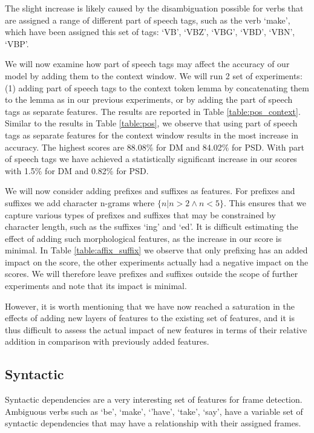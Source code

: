 The slight increase is likely caused by the disambiguation possible for verbs that are assigned a range of different part of speech tags, such as the verb `make', which have been assigned this set of tags: `VB', `VBZ', `VBG', `VBD', `VBN', `VBP'. 

We will now examine how part of speech tags may affect the accuracy of our model by adding them to the context window. We will run 2 set of experiments: (1) adding part of speech tags to the context token lemma by concatenating them to the lemma as in our previous experiments, or by adding the part of speech tags as separate features. The results are reported in Table \ref{table:pos_context}. Similar to the results in Table \ref{table:pos}, we observe that using part of speech tags as separate features for the context window results in the most increase in accuracy. The highest scores are 88.08\% for DM and 84.02\% for PSD. With part of speech tags we have achieved a statistically significant increase in our scores with 1.5\% for DM and 0.82\% for PSD.

We will now consider adding prefixes and suffixes as features. For prefixes and suffixes we add character n-grams where ${\{n|n>2 \wedge n<5\}}$. This ensures that we capture various types of prefixes and suffixes that may be constrained by character length, such as the suffixes `ing' and `ed'. It is difficult estimating the effect of adding such morphological features, as the increase in our score is minimal. In Table \ref{table:affix_suffix} we observe that only prefixing has an added impact on the score, the other experiments actually had a negative impact on the scores. We will therefore leave prefixes and suffixes outside the scope of further experiments and note that its impact is minimal.

However, it is worth mentioning that we have now reached a saturation in the effects of adding new layers of features to the existing set of features, and it is thus difficult to assess the actual impact of new features in terms of their relative addition in comparison with previously added features.

\subsection{Syntactic}
\label{results_syn}


Syntactic dependencies are a very interesting set of features for frame detection. Ambiguous verbs such as `be', `make', `'have', `take', `say', have a variable set of syntactic dependencies that may have a relationship with their assigned frames. 

